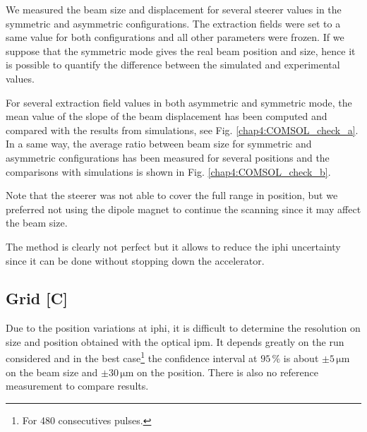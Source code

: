\begin{refsection}
  We measured the beam size and displacement for several steerer values in the symmetric and asymmetric configurations.
  The extraction fields were set to a same value for both configurations and all other parameters were frozen. If we suppose that the symmetric mode gives the real beam position and size, hence it is possible to quantify the difference between the simulated and experimental values.

  For several extraction field values in both asymmetric and symmetric mode, the mean value of the slope of the beam displacement has been computed and compared with the results from simulations, see Fig. \ref{chap4:COMSOL_check_a}. In a same way, the average ratio between beam size for symmetric and asymmetric configurations has been measured for several positions and the comparisons with simulations is shown in Fig. \ref{chap4:COMSOL_check_b}.

  

  Note that the steerer was not able to cover the full range in position, but we preferred not using the dipole magnet to continue the scanning since it may affect the beam size.

  The method is clearly not perfect but it allows to reduce the \acrshort{iphi} uncertainty since it can be done without stopping down the accelerator.

  \subsection{Grid [C]}

  Due to the position variations at \acrshort{iphi}, it is difficult to determine the resolution on size and position obtained with the optical \acrshort{ipm}. It depends greatly on the run considered and in the best case\footnote{For 480 consecutives pulses.} the confidence interval at $95\,\mathrm{\%}$ is about $\pm 5\,\mathrm{\mu m}$ on the beam size and $\pm 30\,\mathrm{\mu m}$ on the position. There is also no reference measurement to compare results.


\end{refsection}
